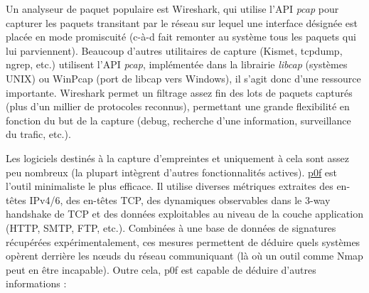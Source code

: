 \documentclass[]{article}
\begin{document}
\par Un analyseur de paquet populaire est Wireshark, qui utilise l'API \textit{pcap} pour capturer les paquets transitant par le réseau sur lequel une interface désignée est placée en mode promiscuité (c-à-d fait remonter au système tous les paquets qui lui parviennent). Beaucoup d'autres utilitaires de capture (Kismet, tcpdump, ngrep, etc.) utilisent l'API \textit{pcap}, implémentée dans la librairie \textit{libcap} (systèmes UNIX) ou WinPcap (port de libcap vers Windows), il s'agit donc d'une ressource importante. Wireshark permet un filtrage assez fin des lots de paquets capturés (plus d'un millier de protocoles reconnus), permettant une grande flexibilité en fonction du but de la capture (debug, recherche d'une information, surveillance du trafic, etc.).\\

\par Les logiciels destinés à la capture d'empreintes et uniquement à cela sont assez peu nombreux (la plupart intègrent d'autres fonctionnalités actives). \href{http://lcamtuf.coredump.cx/p0f3/README}{p0f} est l'outil minimaliste le plus efficace. Il utilise diverses métriques extraites des en-têtes IPv4/6, des en-têtes TCP, des dynamiques observables dans le 3-way handshake de TCP et des données exploitables au niveau de la couche application (HTTP, SMTP, FTP, etc.). Combinées à une base de données de signatures récupérées expérimentalement, ces mesures permettent de déduire quels systèmes opèrent derrière les nœuds du réseau communiquant (là où un outil comme Nmap peut en être incapable). Outre cela, p0f est capable de déduire d'autres informations :
\end{document}
